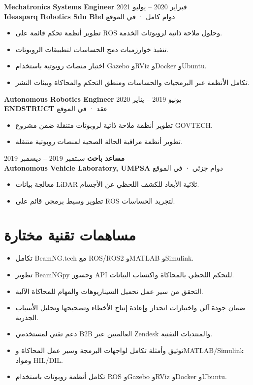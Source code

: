 \documentclass[11pt,a4paper]{article}
\newcommand{\en}[1]{\textenglish{#1}}
\begin{document}
\textbf{\en{Mechatronics Systems Engineer}} \hfill فبراير 2020 -- يوليو 2021\\
\textbf{\en{Ideasparq Robotics Sdn Bhd}} \hfill دوام كامل · في الموقع

\begin{itemize}
    \item تطوير أنظمة تحكم قائمة على \en{ROS} وحلول ملاحة ذاتية لروبوتات الخدمة.
    \item تنفيذ خوارزميات دمج الحساسات لتطبيقات الروبوتات.
    \item اختبار منصات روبوتية باستخدام \en{Gazebo} و\en{RViz} و\en{Docker} و\en{Ubuntu}.
    \item تكامل الأنظمة عبر البرمجيات والحساسات ومنطق التحكم والمحاكاة وبيئات النشر.
\end{itemize}

\textbf{\en{Autonomous Robotics Engineer}} \hfill يونيو 2019 -- يناير 2020\\
\textbf{\en{ENDSTRUCT}} \hfill عقد · في الموقع

\begin{itemize}
    \item تطوير أنظمة ملاحة ذاتية لروبوتات متنقلة ضمن مشروع \en{GOVTECH}.
    \item تطوير أنظمة مراقبة الحالة الصحية لمنصات روبوتية متنقلة.
\end{itemize}

\textbf{مساعد باحث} \hfill سبتمبر 2019 -- ديسمبر 2019\\
\textbf{\en{Autonomous Vehicle Laboratory, UMPSA}} \hfill دوام جزئي · في الموقع

\begin{itemize}
    \item معالجة بيانات \en{LiDAR} ثلاثية الأبعاد للكشف اللحظي عن الأجسام.
    \item تطوير وسيط برمجي قائم على \en{ROS} لتجريد الحساسات.
\end{itemize}

\section*{مساهمات تقنية مختارة}

\begin{itemize}
    \item تكامل \en{BeamNG.tech} مع \en{ROS/ROS2} و\en{MATLAB} و\en{Simulink}.
    \item تطوير \en{BeamNGpy} وجسور \en{API} للتحكم اللحظي بالمحاكاة واكتساب البيانات.
    \item التحقق من سير عمل تحميل السيناريوهات والمهام للمحاكاة الآلية.
    \item ضمان جودة آلي واختبارات انحدار وإعادة إنتاج الأخطاء وتصحيحها وتحليل الأسباب الجذرية.
    \item دعم تقني لمستخدمي \en{B2B} العالميين عبر \en{Zendesk} والمنتديات التقنية.
    \item توثيق وأمثلة تكامل لواجهات البرمجة وسير عمل المحاكاة و\en{MATLAB/Simulink} ومواد \en{HIL/DIL}.
    \item تكامل أنظمة روبوتات باستخدام \en{ROS} و\en{Gazebo} و\en{RViz} و\en{Docker} و\en{Ubuntu}.
\end{itemize}
\end{document}
